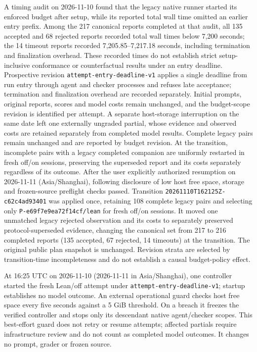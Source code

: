 \documentclass{article}
\begin{document}
A timing audit on 2026-11-10 found that the legacy native runner started its enforced budget after setup, while its reported total wall time omitted an earlier entry prefix. Among the 217 canonical reports completed at that audit, all 135 accepted and 68 rejected reports recorded total wall times below 7,200 seconds; the 14 timeout reports recorded 7,205.85--7,217.18 seconds, including termination and finalization overhead. These recorded times do not establish strict setup-inclusive conformance or counterfactual results under an entry deadline. Prospective revision \texttt{attempt-entry-deadline-v1} applies a single deadline from run entry through agent and checker processes and refuses late acceptance; termination and finalization overhead are recorded separately. Initial prompts, original reports, scores and model costs remain unchanged, and the budget-scope revision is identified per attempt. A separate host-storage interruption on the same date left one externally ungraded partial, whose evidence and observed costs are retained separately from completed model results. Complete legacy pairs remain unchanged and are reported by budget revision. At the transition, incomplete pairs with a legacy completed companion are uniformly restarted in fresh off/on sessions, preserving the superseded report and its costs separately regardless of its outcome. After the user explicitly authorized resumption on 2026-11-11 (Asia/Shanghai), following disclosure of low host free space, storage and frozen-source preflight checks passed. Transition \texttt{20261110T162125Z-c62c4ad93401} was applied once, retaining 108 complete legacy pairs and selecting only \texttt{P-e69f7e9ea72f14cf/lean} for fresh off/on sessions. It moved one unmatched legacy rejected observation and its costs to separately preserved protocol-superseded evidence, changing the canonical set from 217 to 216 completed reports (135 accepted, 67 rejected, 14 timeouts) at the transition. The original public plan snapshot is unchanged. Revision strata are selected by transition-time incompleteness and do not establish a causal budget-policy effect.

At 16:25 UTC on 2026-11-10 (2026-11-11 in Asia/Shanghai), one controller started the fresh Lean/off attempt under \texttt{attempt-entry-deadline-v1}; startup establishes no model outcome. An external operational guard checks host free space every five seconds against a 5 GiB threshold. On a breach it freezes the verified controller and stops only its descendant native agent/checker scopes. This best-effort guard does not retry or resume attempts; affected partials require infrastructure review and do not count as completed model outcomes. It changes no prompt, grader or frozen source.
\end{document}
